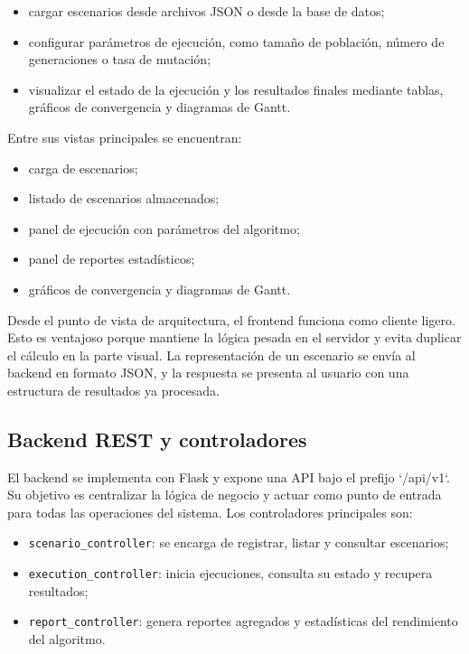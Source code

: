 \documentclass[11pt,a4paper]{article}
\begin{document}
\begin{itemize}
    \item cargar escenarios desde archivos JSON o desde la base de datos;
    \item configurar parámetros de ejecución, como tamaño de población, número de generaciones o tasa de mutación;
    \item visualizar el estado de la ejecución y los resultados finales mediante tablas, gráficos de convergencia y diagramas de Gantt.
\end{itemize}

Entre sus vistas principales se encuentran:

\begin{itemize}
    \item carga de escenarios;
    \item listado de escenarios almacenados;
    \item panel de ejecución con parámetros del algoritmo;
    \item panel de reportes estadísticos;
    \item gráficos de convergencia y diagramas de Gantt.
\end{itemize}

Desde el punto de vista de arquitectura, el frontend funciona como cliente ligero. Esto es ventajoso porque mantiene la lógica pesada en el servidor y evita duplicar el cálculo en la parte visual. La representación de un escenario se envía al backend en formato JSON, y la respuesta se presenta al usuario con una estructura de resultados ya procesada.

\subsection{Backend REST y controladores}

El backend se implementa con Flask y expone una API bajo el prefijo `/api/v1`. Su objetivo es centralizar la lógica de negocio y actuar como punto de entrada para todas las operaciones del sistema. Los controladores principales son:

\begin{itemize}
    \item \texttt{scenario\_controller}: se encarga de registrar, listar y consultar escenarios;
    \item \texttt{execution\_controller}: inicia ejecuciones, consulta su estado y recupera resultados;
    \item \texttt{report\_controller}: genera reportes agregados y estadísticas del rendimiento del algoritmo.
\end{itemize}
\end{document}
